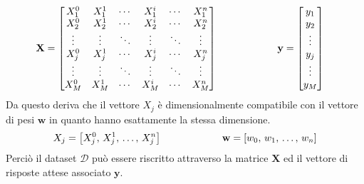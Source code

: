 \begin{gather*}
    \begin{aligned}
        \mathbf{X} &= 
            \begin{bmatrix}
            X_1^0       & X_1^1         & \cdots     & X_1^i         & \cdots     & X_1^n     \\
            X_2^0       & X_2^1         & \cdots     & X_2^i         & \cdots     & X_2^n     \\
            \vdots      & \vdots        & \ddots     & \vdots        & \ddots     & \vdots    \\
            X_j^0       & X_j^1         & \cdots     & X_j^i         & \cdots     & X_j^n     \\
            \vdots      & \vdots        & \ddots     & \vdots        & \ddots     & \vdots    \\
            X_M^0       & X_M^1         & \cdots     & X_M^i         & \cdots     & X_M^n     \\
            \end{bmatrix}
        \hspace{60px}
        \mathbf{y} = 
            \begin{bmatrix}
            y_1 \\ y_2 \\ \vdots \\ y_j \\ \vdots \\ y_M
            \end{bmatrix}
    \end{aligned}
\end{gather*}
% 
\noindent Da questo deriva che il vettore $X_j$ è dimensionalmente compatibile con il vettore di pesi $\mathbf{w}$ in quanto hanno esattamente la stessa dimensione.
% 
\begin{gather*}
    \begin{aligned}
        X_j = \left[ X_j^0,\, X_j^1,\,\dots,\, X_j^n \right]
        \hspace{60px}
        \mathbf{w} = \left[w_0,\, w_1,\, \dots,\, w_n \right]
    \end{aligned}
\end{gather*}
% 
\noindent Perciò il dataset $\mathcal{D}$ può essere riscritto attraverso la matrice $\mathbf{X}$ ed il vettore di risposte attese associato $\mathbf{y}$.
